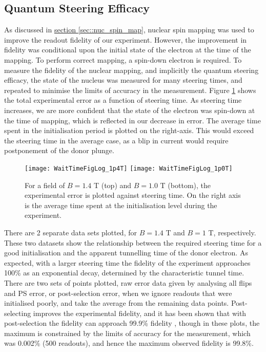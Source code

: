 \label{sec::results}
\subsection{Quantum Steering Efficacy}

	As discussed in \hyperref[sec::nuc_spin_map]{section \ref{sec::nuc_spin_map}}, nuclear spin mapping was used to improve the readout fidelity of our experiment. However, the improvement in fidelity was conditional upon the initial state of the electron at the time of the mapping. To perform correct mapping, a spin-down electron is required. To measure the fidelity of the nuclear mapping, and implicitly the quantum steering efficacy, the state of the nucleus was measured for many steering times, and repeated to minimise the limits of accuracy in the measurement. Figure \ref{fig::wait_time} shows the total experimental error as a function of steering time. As steering time increases, we are more confident that the state of the electron was spin-down at the time of mapping, which is reflected in our decrease in error. The average time spent in the initialisation period is plotted on the right-axis. This would exceed the steering time in the average case, as a blip in current would require postponement of the donor plunge.
	
	\begin{figure}[htbp!]
		\centering
		\texttt{[image: WaitTimeFigLog\_1p4T]}
		\texttt{[image: WaitTimeFigLog\_1p0T]}
		\caption{For a field of $B = 1.4$ T (top) and $B = 1.0$ T (bottom), the experimental error is plotted against steering time. On  the right axis is the average time spent at the initialisation level during the experiment.}
		\label{fig::wait_time}
	\end{figure}
	
	There are 2 separate data sets plotted, for $B = 1.4$ T and $B = 1$ T, respectively. These two datasets show the relationship between the required steering time for a good initialisation and the apparent tunnelling time of the donor electron. As expected, with a larger steering time the fidelity of the experiment approaches 100\% as an exponential decay, determined by the characteristic tunnel time. There are two sets of points plotted, raw error data given by analysing all flips and PS error, or post-selection error, when we ignore readouts that were initialised poorly, and take the average from the remaining data points. Post-selecting improves the experimental fidelity, and it has been shown that with post-selection the fidelity can approach 99.9\% fidelity , though in these plots, the maximum is constrained by the limits of accuracy for the measurement, which was 0.002\% (500 readouts), and hence the maximum observed fidelity is 99.8\%. 
	
